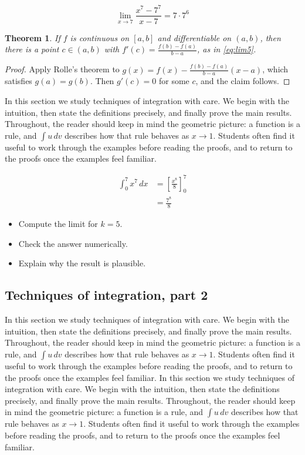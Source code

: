 \documentclass[11pt]{article}
\newtheorem{theorem}{Theorem}[section]
\begin{document}
\begin{equation}
  \lim_{x \to 7} \frac{x^{7} - 7^{7}}{x - 7} = 7 \cdot 7^{6}
  \label{eq:lim5}
\end{equation}

\begin{theorem}
If $f$ is continuous on $[a,b]$ and differentiable on $(a,b)$, then there is a point $c \in (a,b)$ with $f'(c) = \frac{f(b)-f(a)}{b-a}$, as in \eqref{eq:lim5}.
\end{theorem}

\begin{proof}
Apply Rolle's theorem to $g(x) = f(x) - \frac{f(b)-f(a)}{b-a}(x-a)$, which satisfies $g(a) = g(b)$. Then $g'(c) = 0$ for some $c$, and the claim follows.
\end{proof}

In this section we study techniques of integration with care. We begin with the intuition, then state the definitions precisely, and finally prove the main results. Throughout, the reader should keep in mind the geometric picture: a function is a rule, and $\int u\,dv$ describes how that rule behaves as $x \to 1$. Students often find it useful to work through the examples before reading the proofs, and to return to the proofs once the examples feel familiar. 

\begin{align}
  \int_0^{7} x^{7}\,dx &= \left[ \frac{x^{8}}{8} \right]_0^{7} \\
  &= \frac{7^{8}}{8} \label{eq:int5}
\end{align}

\begin{itemize}
  \item Compute the limit for $k = 5$.
  \item Check the answer numerically.
  \item Explain why the result is plausible.
\end{itemize}

\subsection{Techniques of integration, part 2}

In this section we study techniques of integration with care. We begin with the intuition, then state the definitions precisely, and finally prove the main results. Throughout, the reader should keep in mind the geometric picture: a function is a rule, and $\int u\,dv$ describes how that rule behaves as $x \to 1$. Students often find it useful to work through the examples before reading the proofs, and to return to the proofs once the examples feel familiar. In this section we study techniques of integration with care. We begin with the intuition, then state the definitions precisely, and finally prove the main results. Throughout, the reader should keep in mind the geometric picture: a function is a rule, and $\int u\,dv$ describes how that rule behaves as $x \to 1$. Students often find it useful to work through the examples before reading the proofs, and to return to the proofs once the examples feel familiar. 
\end{document}
